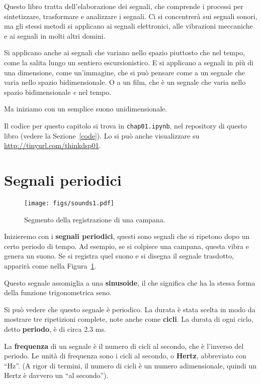 \documentclass[12pt,a4paper]{book}
\begin{document}
Questo libro tratta dell'elaborazione dei segnali, che comprende i processi per sintetizzare, trasformare e analizzare i segnali. Ci si concentrerà sui segnali sonori, ma gli stessi metodi si applicano ai segnali elettronici, alle vibrazioni meccaniche e ai segnali in molti altri domini.

Si applicano anche ai segnali che variano nello spazio piuttosto che nel tempo, come la salita lungo un sentiero escursionistico. E si applicano a segnali in più di una dimensione, come un'immagine, che si può pensare come a un segnale che varia nello spazio bidimensionale. O a un film, che è un segnale che varia nello spazio bidimensionale {\it e} nel tempo.

Ma iniziamo con un semplice suono unidimensionale.

Il codice per questo capitolo si trova in {\tt chap01.ipynb}, nel repository di questo libro (vedere la Sezione~\ref{code}). Lo si può anche visualizzare su \url{http://tinyurl.com/thinkdsp01}.

\section{Segnali periodici} \label{violin} 

\begin{figure} 

\centerline{\texttt{[image: figs/sounds1.pdf]}} \caption{Segmento della registrazione di una campana.} \label{fig.sounds1} \end{figure} 

Inizieremo con i {\bf segnali periodici}, questi sono segnali che si ripetono dopo un certo periodo di tempo. Ad esempio, se si colpisce una campana, questa vibra e genera un suono. Se si registra quel suono e si disegna il segnale trasdotto, apparirà come nella Figura~\ref{fig.sounds1}.

Questo segnale assomiglia a una {\bf sinusoide}, il che significa che ha la stessa forma della funzione trigonometrica seno.

Si può vedere che questo segnale è periodico. La durata è stata scelta in modo da mostrare tre ripetizioni complete, note anche come {\bf cicli}. La durata di ogni ciclo, detto {\bf periodo}, è di circa 2.3 ms.

La {\bf frequenza} di un segnale è il numero di cicli al secondo, che è l'inverso del periodo. Le unità di frequenza sono i cicli al secondo, o {\bf Hertz}, abbreviato con ``Hz''. (A rigor di termini, il numero di cicli è un numero adimensionale, quindi un Hertz è davvero un ``al secondo'').
\end{document}
